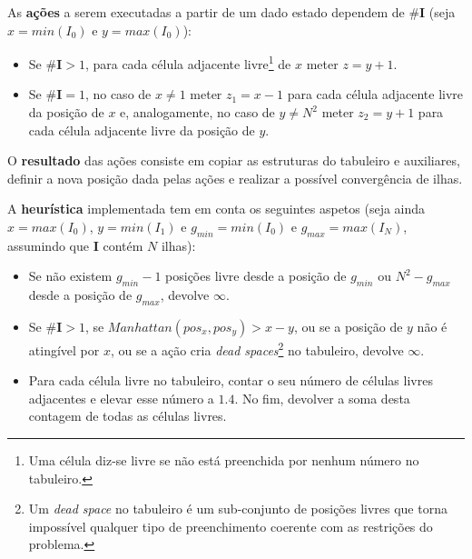 \documentclass[12pt]{exam}
\renewcommand\_{\textunderscore\linebreak[1]}
\begin{document}
        \vspace{-3.5mm}
        \indent As \textbf{ações} a serem executadas a partir de um dado estado dependem de \#\textbf{I} (seja $x = min(I_{0})$ e $y = max(I_{0})$):\\
        \vspace{-6.5mm}
        \begin{itemize}[label=]
          \setlength\itemsep{-0.2em}
            \item Se $\#\textbf{I} > 1$, para cada célula adjacente livre\footnote{Uma célula diz-se livre se não está preenchida por nenhum número no tabuleiro.} de $x$ meter $z = y + 1$.
            \item Se $\#\textbf{I} = 1$, no caso de $x \neq 1$ meter $z_{1} = x - 1$ para cada célula adjacente livre da posição de $x$ e, analogamente, no caso de $y \neq N^2$ meter $z_{2} = y + 1$ para cada célula adjacente livre da posição de $y$.
        \end{itemize}
        \vspace{-3mm}

        \indent O \textbf{resultado} das ações consiste em copiar as estruturas do tabuleiro e auxiliares, definir a nova posição dada pelas ações e realizar a possível convergência de ilhas.

        \indent A \textbf{heurística} implementada tem em conta os seguintes aspetos (seja ainda $x = max(I_{0})$, $y = min(I_{1})$ e $g_{min} = min(I_{0})$ e $g_{max} = max(I_{N})$, assumindo que \textbf{I} contém $N$ ilhas):
        \vspace{-2mm}
        \begin{itemize}[label=]
          \setlength\itemsep{-0.2em}
            \item Se não existem $g_{min} - 1$ posições livre desde a posição de $g_{min}$ ou $N^2 - g_{max}$ desde a posição de $g_{max}$, devolve $\infty$.
            \item Se $\#\textbf{I} > 1$, se $Manhattan(pos_{x}, pos_{y}) > x - y$, ou se a posição de $y$ não é atingível por $x$, ou se a ação cria \textit{dead spaces}\footnote{Um \textit{dead space} no tabuleiro é um sub-conjunto de posições livres que torna impossível qualquer tipo de preenchimento coerente com as restrições do problema.} no tabuleiro, devolve $\infty$.
            \item Para cada célula livre no tabuleiro, contar o seu número de células livres adjacentes e elevar esse número a $1.4$. No fim, devolver a soma desta contagem de todas as células livres.
        \end{itemize}
\end{document}
